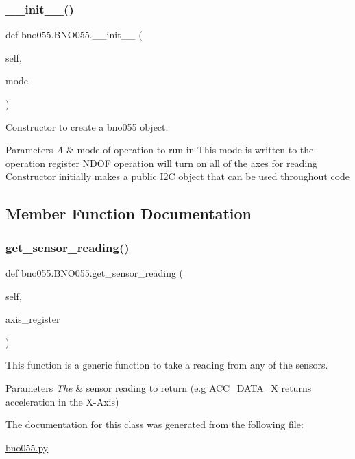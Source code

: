\subsubsection{\texorpdfstring{\_\_init\_\_()}{\_\_init\_\_()}}
{\footnotesize\ttfamily def bno055.\+B\+N\+O055.\+\_\+\+\_\+init\+\_\+\+\_\+ (\begin{DoxyParamCaption}\item[{}]{self,  }\item[{}]{mode }\end{DoxyParamCaption})}



Constructor to create a bno055 object. 


\begin{DoxyParams}{Parameters}
{\em A} & mode of operation to run in This mode is written to the operation register N\+D\+OF operation will turn on all of the axes for reading Constructor initially makes a public I2C object that can be used throughout code \\
\hline
\end{DoxyParams}


\subsection{Member Function Documentation}
\mbox{\label{classbno055_1_1_b_n_o055_a8930cf974921f89580761cad8881e9d8}} 
\subsubsection{\texorpdfstring{get\_sensor\_reading()}{get\_sensor\_reading()}}
{\footnotesize\ttfamily def bno055.\+B\+N\+O055.\+get\+\_\+sensor\+\_\+reading (\begin{DoxyParamCaption}\item[{}]{self,  }\item[{}]{axis\+\_\+register }\end{DoxyParamCaption})}



This function is a generic function to take a reading from any of the sensors. 


\begin{DoxyParams}{Parameters}
{\em The} & sensor reading to return (e.\+g A\+C\+C\+\_\+\+D\+A\+T\+A\+\_\+X returns acceleration in the X-\/\+Axis) \\
\hline
\end{DoxyParams}


The documentation for this class was generated from the following file\+:\begin{DoxyCompactItemize}
\item 
\mbox{\hyperlink{bno055_8py}{bno055.\+py}}\end{DoxyCompactItemize}
